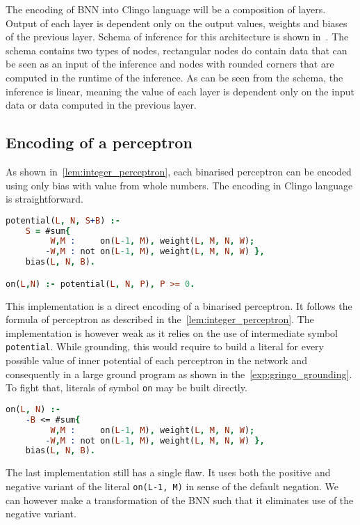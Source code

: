 The encoding of BNN into Clingo language will be a composition of layers.
Output of each layer is dependent only on the output values, weights and biases
of the previous layer. Schema of inference for this architecture is shown
in~. The schema contains two types of nodes,
rectangular nodes do contain data that can be seen as an input of the inference
and nodes with rounded corners that are computed in the runtime of the inference.
As can be seen from the schema, the inference is linear, meaning the value of each
layer is dependent only on the input data or data computed in the previous layer.

\subsection{Encoding of a perceptron}

As shown in~\cref{lem:integer_perceptron}, each binarised perceptron can be encoded
using only bias with value from whole numbers. The encoding in Clingo language is
straightforward.

\begin{lstlisting}[language=Prolog, numbers=none]
potential(L, N, S+B) :-
    S = #sum{
         W,M :     on(L-1, M), weight(L, M, N, W);
        -W,M : not on(L-1, M), weight(L, M, N, W) },
    bias(L, N, B).

on(L,N) :- potential(L, N, P), P >= 0.
\end{lstlisting}

This implementation is a direct encoding of a binarised perceptron.
It follows the formula of perceptron as described in the~\cref{lem:integer_perceptron}.
The implementation is however weak as it relies on the use of intermediate
symbol \texttt{potential}. While grounding, this would require to build a literal
for every possible value of inner potential of each perceptron in the network
and consequently in a large ground program as shown in the~\cref{exp:gringo_grounding}.
To fight that, literals of symbol \texttt{on} may be built directly.

\begin{lstlisting}[language=Prolog, numbers=none]
on(L, N) :-
    -B <= #sum{
         W,M :     on(L-1, M), weight(L, M, N, W);
        -W,M : not on(L-1, M), weight(L, M, N, W) },
    bias(L, N, B).
\end{lstlisting}


The last implementation still has a single flaw. It uses both the positive
and negative variant of the literal \texttt{on(L-1, M)} in sense of the default
negation. We can however make a transformation of the BNN such that it eliminates
use of the negative variant.%
\label{sec:01-mapping}

